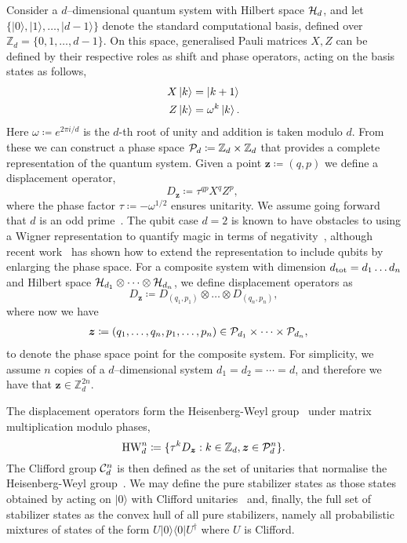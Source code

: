 \documentclass[
onecolumn,
superscriptaddress
]{revtex4-1}
\def\>{\rangle}
\def\<{\langle}
\def\z{\boldsymbol{z}}
\def\H{{\cal H}}
\renewcommand{\P}{{\cal P}}
\begin{document}
Consider a $d$--dimensional quantum system with Hilbert space $\H_d$, and let $\{ |0\>, |1\>, \dots , |d-1\>\}$ denote the standard computational basis, defined over $\mathbb{Z}_d = \{ 0, 1, \dots,d-1 \}$. On this space, generalised Pauli matrices $X, Z$ can be defined by their respective roles as shift and phase operators, acting on the basis states as follows,
\begin{align}
    X \ket{k} &= \ket{k + 1} \label{eq:xpauli}\\
	Z \ket{k} &= \omega^k \ket{k}. \label{eq:zpauli}
\end{align}
Here $\omega \coloneqq e^{2\pi i/d}$ is the $d$-th root of unity and addition is taken modulo $d$. From these we can construct a phase space $\P_d \coloneqq \mathbb{Z}_d \times \mathbb{Z}_d$ that provides a complete representation of the quantum system. Given a point $\z \coloneqq (q, p)$ we define a displacement operator, 
\begin{equation}\label{eq:ddef}
    D_{\z} \coloneqq \tau^{q p} X^{q} Z^{p},\ 
\end{equation}
where the phase factor $\tau \coloneqq -\omega^{1/2}$ ensures unitarity. We assume going forward that $d$ is an odd prime~\cite{Appleby_2005}. The qubit case $d=2$ is known to have obstacles to using a Wigner representation to quantify magic in terms of negativity~\cite{Mermin_1990, cit:howard2}, although recent work~\cite{Raussendorf_qubits} has shown how to extend the representation to include qubits by enlarging the phase space. For a composite system with dimension $d_{\rm tot} = d_1 \dots d_n$ and Hilbert space $\H_{d_1} \otimes \dots \otimes \H_{d_n}$, we define displacement operators as
\begin{equation}\label{eq:composited}
    D_{\z} \coloneqq D_{(q_1, p_1)} \otimes \dots \otimes D_{(q_n, p_n)},
\end{equation}
where now we have
\begin{align*}
	\z &\coloneqq (q_1, \dots, q_n, p_1, \dots, p_n) \in \P_{d_1} \times \dots \times \P_{d_n},
\end{align*}
to denote the phase space point for the composite system. 
For simplicity, we assume $n$ copies of a $d$--dimensional system $d_1=d_2 = \cdots = d$, and therefore we have that $\z \in \mathbb{Z}_d^{2n}$.


The displacement operators form the Heisenberg-Weyl group~\cite{Folland_1989, Bengtsson_2006} under matrix multiplication modulo phases,
\begin{equation}\label{eq:gp}
    {\rm{HW}}_d^n \coloneqq \{ \tau^k D_{\z}: k \in \mathbb{Z}_d, \z \in \P_d^n\}.
\end{equation}
The Clifford group $ {\cal C}_d^n $ is then defined as the set of unitaries that normalise the Heisenberg-Weyl group~\cite{Appleby_2005}. We may define the pure stabilizer states as those states obtained by acting on $|0\>$ with Clifford unitaries~\cite{Gross2006} and, finally, the full set of stabilizer states as the convex hull of all pure stabilizers, namely all probabilistic mixtures of states of the form $U|0\>\<0|U^\dagger$ where $U$ is Clifford. 
\end{document}
